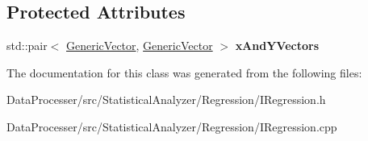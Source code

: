 \subsection*{Protected Attributes}
\begin{DoxyCompactItemize}
\item 
\mbox{\label{classIRegression_abdce3eb0c896fe60b6c272060eab7860}} 
std\+::pair$<$ \hyperlink{classGenericVector}{Generic\+Vector}, \hyperlink{classGenericVector}{Generic\+Vector} $>$ {\bfseries x\+And\+Y\+Vectors}
\end{DoxyCompactItemize}


The documentation for this class was generated from the following files\+:\begin{DoxyCompactItemize}
\item 
Data\+Processer/src/\+Statistical\+Analyzer/\+Regression/I\+Regression.\+h\item 
Data\+Processer/src/\+Statistical\+Analyzer/\+Regression/I\+Regression.\+cpp\end{DoxyCompactItemize}
